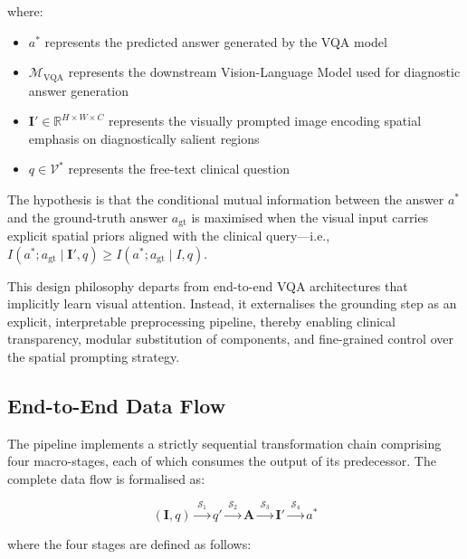 where:
\begin{itemize}
\item $a^{*}$ represents the predicted answer generated by the VQA model
\item $\mathcal{M}_{\text{VQA}}$ represents the downstream Vision-Language Model used for diagnostic answer generation
\item $\mathbf{I}' \in \mathbb{R}^{H \times W \times C}$ represents the visually prompted image encoding spatial emphasis on diagnostically salient regions
\item $q \in \mathcal{V}^*$ represents the free-text clinical question
\end{itemize}

The hypothesis is that the conditional mutual information between the answer $a^{*}$ and the ground-truth answer $a_{\text{gt}}$ is maximised when the visual input carries explicit spatial priors aligned with the clinical query—i.e., $I\left(a^{*}; a_{\text{gt}} \mid \mathbf{I}', q\right) \geq I\left(a^{*}; a_{\text{gt}} \mid I, q\right)$.

This design philosophy departs from end-to-end VQA architectures that implicitly learn visual attention. Instead, it externalises the grounding step as an explicit, interpretable preprocessing pipeline, thereby enabling clinical transparency, modular substitution of components, and fine-grained control over the spatial prompting strategy.

\subsection{End-to-End Data Flow}
\label{sec:3_1_2}
The pipeline implements a strictly sequential transformation chain comprising four macro-stages, each of which consumes the output of its predecessor. The complete data flow is formalised as:

\[
(\mathbf{I}, q) \xrightarrow{\;\mathcal{S}_1\;} q' \xrightarrow{\;\mathcal{S}_2\;} \mathbf{A} \xrightarrow{\;\mathcal{S}_3\;} \mathbf{I}' \xrightarrow{\;\mathcal{S}_4\;} a^{*}
\]

where the four stages are defined as follows:

